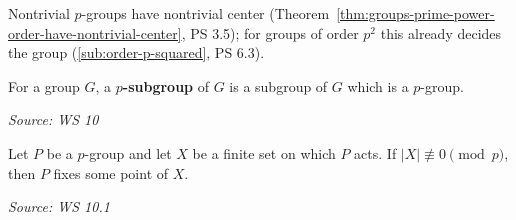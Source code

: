 \documentclass[11pt]{report}
\newcommand{\srcline}[1]{\par\hfill{\footnotesize\textit{Source: #1}}}
\begin{document}
Nontrivial $p$-groups have nontrivial center (Theorem~\ref{thm:groups-prime-power-order-have-nontrivial-center}, PS 3.5); for groups of order $p^2$ this already decides the group (\ref{sub:order-p-squared}, PS 6.3).

\begin{defbox}[{$p$-Subgroup}]\label{def:p-subgroup}
For a group $G$, a \textbf{$p$-subgroup} of $G$ is a subgroup of $G$ which is a $p$-group.
\srcline{WS 10}
\end{defbox}

\begin{propbox}\label{prop:p-group-fixed-point}
Let $P$ be a $p$-group and let $X$ be a finite set on which $P$ acts. If $|X| \not\equiv 0 \pmod p$, then $P$ fixes some point of $X$.
\srcline{WS 10.1}
\end{propbox}
\end{document}
